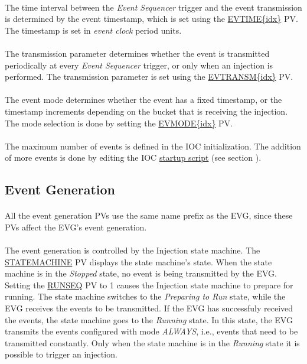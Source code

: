 \documentclass[openany]{article}
\begin{document}
		\paragraph{} The time interval between the \emph{Event Sequencer} trigger and the event transmission is determined by the event timestamp, which is set using the \hyperref[pvgroup:evg-event]{EVTIME\{idx\}} PV. The timestamp is set in \emph{event clock} period units.
		\paragraph{} The transmission parameter determines whether the event is transmitted periodically at every \emph{Event Sequencer} trigger, or only when an injection is performed. The transmission parameter is set using the \hyperref[pvgroup:evg-event]{EVTRANSM\{idx\}} PV.
		\paragraph{} The event mode determines whether the event has a fixed timestamp, or the timestamp increments depending on the bucket that is receiving the injection. The mode selection is done by setting the \hyperref[pvgroup:evg-event]{EVMODE\{idx\}} PV. 
		\paragraph{} The maximum number of events is defined in the IOC initialization. The addition of more events is done by editing the IOC \hyperref[sec:startup-script]{startup script} (see section ).

	\subsection{Event Generation}
		\paragraph{} All the event generation PVs use the same name prefix as the EVG, since these PVs affect the EVG's event generation.
		\paragraph{} The event generation is controlled by the Injection state machine. The \hyperref[pvgroup:evg-injection]{STATEMACHINE} PV displays the state machine's state. When the state machine is in the \emph{Stopped} state, no event is being transmitted by the EVG. Setting the \hyperref[pvgroup:evg-injection]{RUNSEQ} PV to 1 causes the Injection state machine to prepare for running. The state machine switches to the \emph{Preparing to Run} state, while the EVG receives the events to be transmitted. If the EVG has successfuly received the events, the state machine goes to the \emph{Running} state. In this state, the EVG transmits the events configured with mode \emph{ALWAYS}, i.e., events that need to be transmitted constantly. Only when the state machine is in the \emph{Running} state it is possible to trigger an injection.
\end{document}
